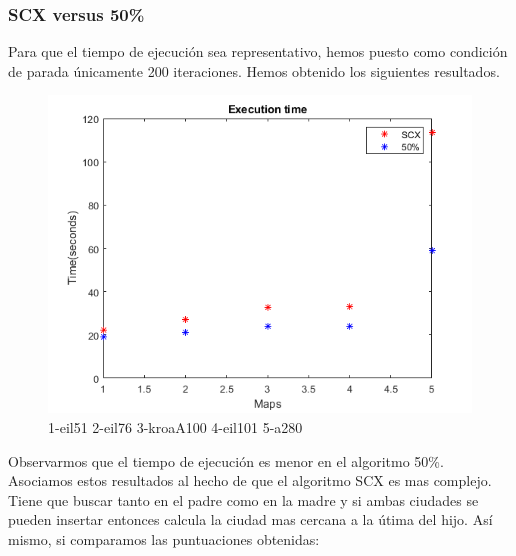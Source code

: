 \documentclass{article}
\begin{document}
\subsubsection{SCX versus 50\%} 
Para que el tiempo de ejecución sea representativo, hemos puesto como condición de parada únicamente 
200 iteraciones. Hemos obtenido los siguientes resultados. 
\begin{figure}[H]
    \centering
    \includegraphics[width=1\textwidth]{tiempo.png}
    \caption{1-eil51 2-eil76 3-kroaA100 4-eil101 5-a280}
\end{figure}

Observarmos que el tiempo de ejecución es menor en el algoritmo 50\%. Asociamos estos resultados al hecho 
de que el algoritmo SCX es mas complejo. Tiene que buscar tanto en el padre como en la madre y si ambas 
ciudades se pueden insertar entonces calcula la ciudad mas cercana a la útima del hijo.  
Así mismo, si comparamos las puntuaciones obtenidas:
\end{document}
